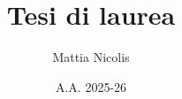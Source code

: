 \documentclass[a4paper,12pt,openright]{book}
\title{\textbf{Tesi di laurea}}
\author{Mattia Nicolis}
\date{A.A. 2025-26}
\begin{document}
    \maketitle

    \tableofcontents
    \markboth{}{}
\end{document}
